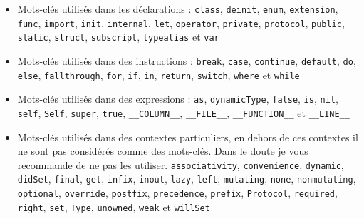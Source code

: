 \begin{itemize}

\item Mots-clés utilisés dans les déclarations :
\texttt{class},
\texttt{deinit},
\texttt{enum},
\texttt{extension},
\texttt{func},
\texttt{import},
\texttt{init},
\texttt{internal},
\texttt{let},
\texttt{operator},
\texttt{private},
\texttt{protocol},
\texttt{public},
\texttt{static},
\texttt{struct},
\texttt{subscript},
\texttt{typealias} et
\texttt{var}

\item Mots-clés utilisés dans des instructions :
\texttt{break},
\texttt{case},
\texttt{continue},
\texttt{default},
\texttt{do},
\texttt{else},
\texttt{fallthrough},
\texttt{for},
\texttt{if},
\texttt{in},
\texttt{return},
\texttt{switch},
\texttt{where} et
\texttt{while}

\item Mots-clés utilisés dans des expressions :
\texttt{as},
\texttt{dynamicType},
\texttt{false},
\texttt{is},
\texttt{nil},
\texttt{self},
\texttt{Self},
\texttt{super},
\texttt{true},
\texttt{__COLUMN__},
\texttt{__FILE__},
\texttt{__FUNCTION__} et
\texttt{__LINE__}

\item Mots-clés utilisés dans des contextes particuliers, en dehors de ces contextes il ne sont pas considérés comme des mots-clés.
Dans le doute je vous recommande de ne pas les utiliser.
\texttt{associativity},
\texttt{convenience},
\texttt{dynamic},
\texttt{didSet},
\texttt{final},
\texttt{get},
\texttt{infix},
\texttt{inout},
\texttt{lazy},
\texttt{left},
\texttt{mutating},
\texttt{none},
\texttt{nonmutating},
\texttt{optional},
\texttt{override},
\texttt{postfix},
\texttt{precedence},
\texttt{prefix},
\texttt{Protocol},
\texttt{required},
\texttt{right},
\texttt{set},
\texttt{Type},
\texttt{unowned},
\texttt{weak} et
\texttt{willSet}
\end{itemize}

